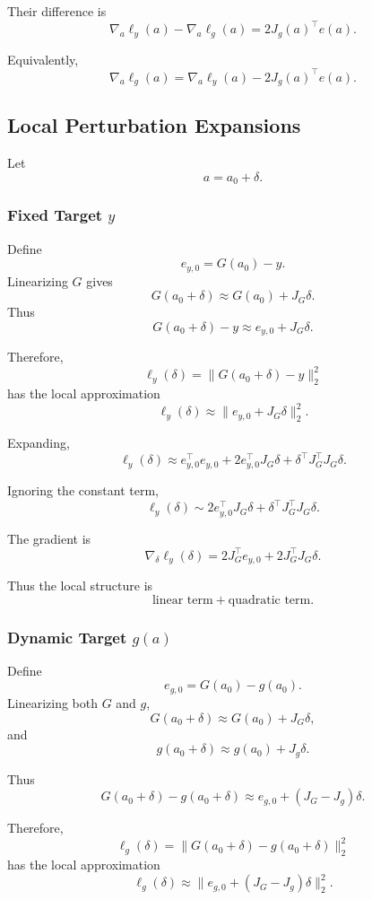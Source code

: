 \documentclass{article}
\begin{document}
Their difference is
\[
    \nabla_a \ell_y(a)-\nabla_a \ell_g(a)
    =
    2J_g(a)^\top e(a).
\]

Equivalently,
\[
    \nabla_a \ell_g(a)
    =
    \nabla_a \ell_y(a)
    -
    2J_g(a)^\top e(a).
\]

\subsection{Local Perturbation Expansions}

Let
\[
    a=a_0+\delta.
\]

\subsubsection{Fixed Target \(y\)}

Define
\[
    e_{y,0}=G(a_0)-y.
\]
Linearizing \(G\) gives
\[
    G(a_0+\delta)
    \approx
    G(a_0)+J_G\delta.
\]
Thus
\[
    G(a_0+\delta)-y
    \approx
    e_{y,0}+J_G\delta.
\]

Therefore,
\[
    \ell_y(\delta)
    =
    \|G(a_0+\delta)-y\|_2^2
\]
has the local approximation
\[
    \ell_y(\delta)
    \approx
    \|e_{y,0}+J_G\delta\|_2^2.
\]

Expanding,
\[
    \ell_y(\delta)
    \approx
    e_{y,0}^\top e_{y,0}
    +
    2e_{y,0}^\top J_G\delta
    +
    \delta^\top J_G^\top J_G\delta.
\]

Ignoring the constant term,
\[
    \ell_y(\delta)
    \sim
    2e_{y,0}^\top J_G\delta
    +
    \delta^\top J_G^\top J_G\delta.
\]

The gradient is
\[
    \boxed{
    \nabla_\delta \ell_y(\delta)
    =
    2J_G^\top e_{y,0}
    +
    2J_G^\top J_G\delta
    }.
\]

Thus the local structure is
\[
    \text{linear term}+\text{quadratic term}.
\]

\subsubsection{Dynamic Target \(g(a)\)}

Define
\[
    e_{g,0}=G(a_0)-g(a_0).
\]
Linearizing both \(G\) and \(g\),
\[
    G(a_0+\delta)
    \approx
    G(a_0)+J_G\delta,
\]
and
\[
    g(a_0+\delta)
    \approx
    g(a_0)+J_g\delta.
\]

Thus
\[
    G(a_0+\delta)-g(a_0+\delta)
    \approx
    e_{g,0}+(J_G-J_g)\delta.
\]

Therefore,
\[
    \ell_g(\delta)
    =
    \|G(a_0+\delta)-g(a_0+\delta)\|_2^2
\]
has the local approximation
\[
    \ell_g(\delta)
    \approx
    \|e_{g,0}+(J_G-J_g)\delta\|_2^2.
\]
\end{document}

